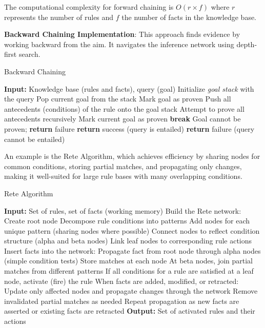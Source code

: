 \documentclass[12pt,a4paper]{article}
\begin{document}
The computational complexity for forward chaining is $O(r \times f)$ where $r$ represents the number of rules and $f$ the number of facts in the knowledge base.

\textbf{Backward Chaining Implementation}: This approach finds evidence by working backward from the aim. It navigates the inference network using depth-first search.

\begin{algorithm}
\caption{Backward Chaining}
\begin{algorithmic}
\STATE \textbf{Input:} Knowledge base (rules and facts), query (goal)
\STATE Initialize \emph{goal stack} with the query
\STATE Pop current goal from the stack
\STATE Mark goal as proven
\STATE Push all antecedents (conditions) of the rule onto the goal stack
\STATE Attempt to prove all antecedents recursively
\STATE Mark current goal as proven
\STATE \textbf{break}
\ENDIF
\ENDFOR
\ELSE
\STATE Goal cannot be proven; \textbf{return} failure
\ENDIF
\ENDWHILE
{}
\STATE \textbf{return} success (query is entailed)
\ELSE
\STATE \textbf{return} failure (query cannot be entailed)
\ENDIF
\end{algorithmic}
\end{algorithm}

An example is the Rete Algorithm, which achieves efficiency by sharing nodes for common conditions, storing partial matches, and propagating only changes, making it well-suited for large rule bases with many overlapping conditions.

\begin{algorithm}
\caption{Rete Algorithm}
\begin{algorithmic}
\STATE \textbf{Input:} Set of rules, set of facts (working memory)
\STATE Build the Rete network:
\STATE \quad Create root node
\STATE Decompose rule conditions into patterns
\STATE Add nodes for each unique pattern (sharing nodes where possible)
\STATE Connect nodes to reflect condition structure (alpha and beta nodes)
\STATE Link leaf nodes to corresponding rule actions
\ENDFOR
\STATE Insert facts into the network:
\STATE Propagate fact from root node through alpha nodes (simple condition tests)
\STATE Store matches at each node
\STATE At beta nodes, join partial matches from different patterns
\STATE If all conditions for a rule are satisfied at a leaf node, activate (fire) the rule
\ENDFOR
\STATE When facts are added, modified, or retracted:
\STATE \quad Update only affected nodes and propagate changes through the network
\STATE \quad Remove invalidated partial matches as needed
\STATE Repeat propagation as new facts are asserted or existing facts are retracted
\STATE \textbf{Output:} Set of activated rules and their actions
\end{algorithmic}
\end{algorithm}
\end{document}
